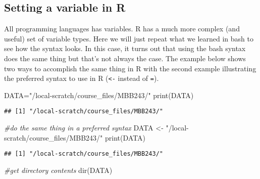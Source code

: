\documentclass[
]{article}
\newenvironment{Shaded}{\begin{snugshade}}{\end{snugshade}}
\newcommand{\CommentTok}[1]{\textcolor[rgb]{0.56,0.35,0.01}{\textit{#1}}}
\newcommand{\FunctionTok}[1]{\textcolor[rgb]{0.00,0.00,0.00}{#1}}
\newcommand{\NormalTok}[1]{#1}
\newcommand{\OtherTok}[1]{\textcolor[rgb]{0.56,0.35,0.01}{#1}}
\newcommand{\StringTok}[1]{\textcolor[rgb]{0.31,0.60,0.02}{#1}}
\begin{document}
\hypertarget{setting-a-variable-in-r}{%
\subsection{Setting a variable in R}\label{setting-a-variable-in-r}}

All programming languages has variables. R has a much more complex (and
useful) set of variable types. Here we will just repeat what we learned
in bash to see how the syntax looks. In this case, it turns out that
using the bash syntax does the same thing but that's not always the
case. The example below shows two ways to accomplish the same thing in R
with the second example illustrating the preferred syntax to use in R
(\texttt{\textless{}-} instead of \texttt{=}).

\begin{Shaded}
\begin{Highlighting}[]
\NormalTok{DATA}\OtherTok{=}\StringTok{"/local{-}scratch/course\_files/MBB243/"}
\FunctionTok{print}\NormalTok{(DATA)}
\end{Highlighting}
\end{Shaded}

\begin{verbatim}
## [1] "/local-scratch/course_files/MBB243/"
\end{verbatim}

\begin{Shaded}
\begin{Highlighting}[]
\CommentTok{\#do the same thing in a preferred syntax}
\NormalTok{DATA }\OtherTok{\textless{}{-}} \StringTok{"/local{-}scratch/course\_files/MBB243/"}
\FunctionTok{print}\NormalTok{(DATA)}
\end{Highlighting}
\end{Shaded}

\begin{verbatim}
## [1] "/local-scratch/course_files/MBB243/"
\end{verbatim}

\begin{Shaded}
\begin{Highlighting}[]
\CommentTok{\#get directory contents}
\FunctionTok{dir}\NormalTok{(DATA)}
\end{Highlighting}
\end{Shaded}
\end{document}
